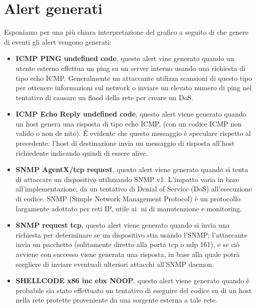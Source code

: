 \section{Alert generati}

Esponiamo per una più chiara interpretazione del grafico a seguito di che genere di eventi gli alert vengono generati:

\begin{itemize}

    \item \textbf{ICMP PING undefined code}, questo alert vine generato quando un utente esterno effettua un ping su un server interno usando una richiesta di tipo echo ICMP. Generalmente un attaccante utilizza scansioni di questo tipo per ottenere informazioni sul network o inviare un elevato numero di ping nel tentativo di causare un flood della rete per creare un DoS.

    \item \textbf{ICMP Echo Reply undefined code}, questo alert viene generato quando un host genera una risposta di tipo echo ICMP, (con un codice ICMP non valido o non denito). \'E evidente che questo messaggio è speculare rispetto al precedente: l'host di destinazione invia un messaggio di risposta all'host richiedente indicando quindi di essere alive.

    \item \textbf{SNMP AgentX/tcp request}, questo alert viene generato quando si tenta di attaccare un dispositivo utilizzando SNMP v1. L'impatto varia in base all'implementazione, da un tentativo di Denial of Service (DoS) all'esecuzione di codice. SNMP (Simple Network Management Protocol) è un protocollo largamente adottato per reti IP, utile ai ni di manutenzione e monitoring.

    \item \textbf{SNMP request tcp}, questo alert viene generato quando si invia una richiesta per determinare se un dispositivo stia usando l'SNMP; l'attaccante invia un pacchetto (solitamente diretto alla porta tcp o udp 161), e se ciò avviene con successo viene generata una risposta, in base alla quale potrà scegliere di inviare eventuali ulteriori attacchi all'SNMP daemon.

    \item \textbf{SHELLCODE x86 inc ebx NOOP}, questo alert viene generato quando è probabile sia stato effettuato un tentativo di eseguire del codice su di un host nella rete protette proveniente da una sorgente esterna a tale rete.


\end{itemize}
